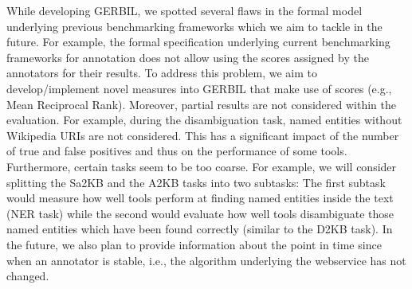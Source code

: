 While developing GERBIL, we spotted several flaws in the formal model underlying previous benchmarking frameworks which we aim to tackle in the future. 
For example, the formal specification underlying current benchmarking frameworks for annotation does not allow using the scores assigned by the annotators for their results. To address this problem, we aim to develop/implement novel measures into GERBIL that make use of scores (e.g., Mean Reciprocal Rank). 
Moreover, partial results are not considered within the evaluation. For example, during the disambiguation task, named entities without Wikipedia URIs are not considered. This has a significant impact of the number of true and false positives and thus on the performance of some tools.
Furthermore, certain tasks seem to be too coarse. For example, we will consider splitting the Sa2KB and the A2KB tasks into two subtasks: The first subtask would measure how well tools perform at finding named entities inside the text (NER task) while the second would evaluate how well tools disambiguate those named entities which have been found correctly (similar to the D2KB task).
In the future, we also plan to provide information about the point in time since when an annotator is stable, i.e., the algorithm underlying the webservice has not changed.


%
%


